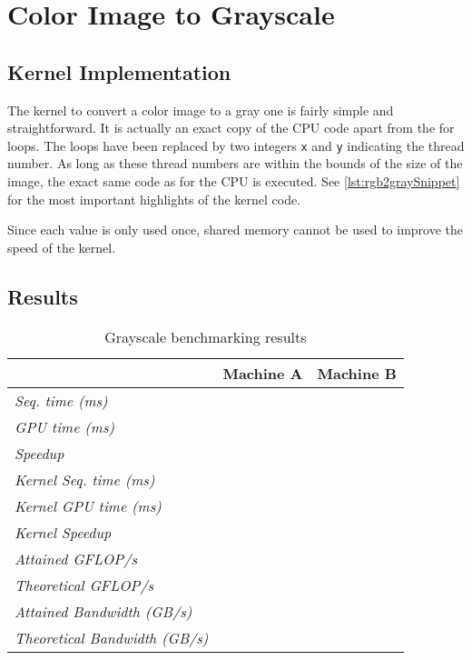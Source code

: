 \documentclass[final]{report}
\begin{document}
\chapter{Color Image to Grayscale}

\section{Kernel Implementation}\label{sec:rgb2gray}
The kernel to convert a color image to a gray one is fairly simple and straightforward.
It is actually an exact copy of the CPU code apart from the for loops.
The loops have been replaced by two integers \texttt{x} and \texttt{y} indicating the thread number.
As long as these thread numbers are within the bounds of the size of the image, the exact same code as for the CPU is executed.
See \cref{lst:rgb2graySnippet} for the most important highlights of the kernel code.


Since each value is only used once, shared memory cannot be used to improve the speed of the kernel.


\section{Results}
\begin{table}[H]
	\centering
	\caption{Grayscale benchmarking results}
	\label{tab:rgb2grayscale-results}
	\begin{tabular}{lll}
	\toprule
											& \textbf{Machine A} 	& \textbf{Machine B} \\
	\midrule
	\textit{Seq. time (ms)} 				& ~ 					& ~ \\
	\textit{GPU time (ms)} 					& ~ 					& ~ \\
	\textit{Speedup} 						& ~ 					& ~ \\
	\midrule
	\textit{Kernel Seq. time (ms)} 			& ~ 					& ~ \\
	\textit{Kernel GPU time (ms)} 			& ~ 					& ~ \\
	\textit{Kernel Speedup} 				& ~ 					& ~ \\
	\midrule
	\textit{Attained GFLOP/s} 				& ~ 					& ~ \\
	\textit{Theoretical GFLOP/s} 			& ~ 					& ~ \\
	\textit{Attained Bandwidth (GB/s)}		& ~ 					& ~ \\
	\textit{Theoretical Bandwidth (GB/s)}	& ~ 					& ~ \\
	\bottomrule
	\end{tabular}
\end{table}
\end{document}

